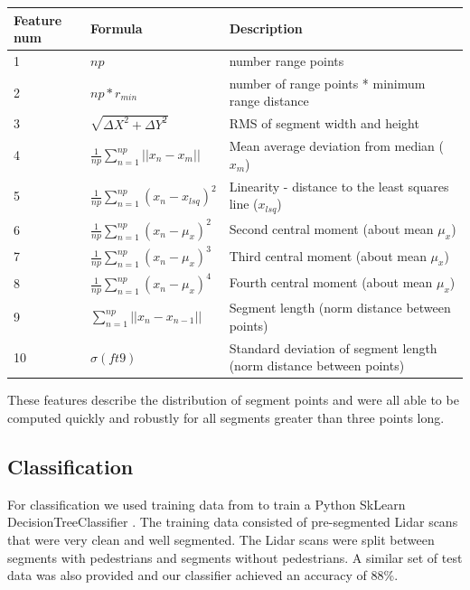 \documentclass[10pt,twocolumn,letterpaper]{article}
\begin{document}
  \renewcommand{\arraystretch}{1.5}
  \begin{center}
    \begin{tabular}{ | p{1cm} | l | p{2.9cm} |}
      \hline
      Feature num & Formula & Description \\ \hline
      1 & $ np $ & number range points \\ \hline
      2 & $np*r_{min}$ & number of range points * minimum range distance \\ \hline
      3 & $\sqrt{ \Delta X^2 + \Delta Y^2} $ & RMS of segment width and height
      \\ \hline
      4 & $ \frac{1}{np}\sum_{n=1}^{np} || x_n - x_m|| $ & Mean average deviation
      from median ($x_m$) \\ \hline
      5 & $ \frac{1}{np}\sum_{n=1}^{np} (x_n - x_{lsq})^2 $ & Linearity -
      distance to the least squares line ($ x_{lsq}$) \\ \hline
      6 & $ \frac{1}{np}\sum_{n=1}^{np} (x_n - \mu_x)^2 $ & Second central
      moment (about mean $\mu_x$) \\ \hline
      7 & $ \frac{1}{np}\sum_{n=1}^{np} (x_n - \mu_x)^3 $ & Third central
      moment (about mean $\mu_x$) \\ \hline
      8 & $ \frac{1}{np}\sum_{n=1}^{np} (x_n - \mu_x)^4 $ & Fourth central
      moment (about mean $\mu_x$) \\ \hline
      9 & $ \sum_{n=1}^{np} ||x_n - x_{n-1}|| $ & Segment length (norm distance
      between points) \\ \hline
      10 & $ \sigma(ft9) $ & Standard deviation of
      segment length (norm distance between points) \\ \hline
    \end{tabular}
  \end{center}

  These features describe the distribution of segment points and were all able to
  be computed quickly and robustly for all segments greater than three points long.

  \subsection{Classification}
  For classification we used training data from \cite{dataset} to train a Python
  SkLearn DecisionTreeClassifier \cite{sklearn}. The training data consisted of
  pre-segmented Lidar scans that were very clean and well segmented. The Lidar
  scans were split between segments with pedestrians and segments without
  pedestrians. A similar set of test data was also provided and our classifier
  achieved an accuracy of 88\%.
\end{document}
